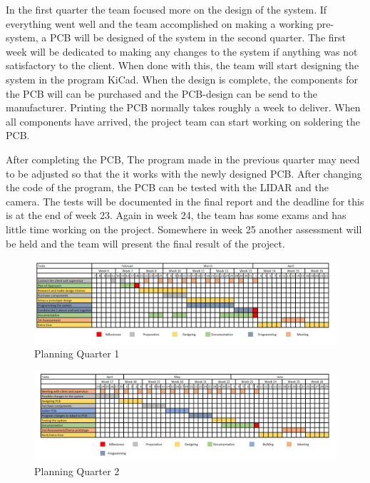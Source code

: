 In the first quarter the team focused more on the design of the system. If everything went well and the team accomplished on making a working pre-system, a PCB will be designed of the system in the second quarter. The first week will be dedicated to making any changes to the system if anything was not satisfactory to the client. When done with this, the team will start designing the system in the program KiCad. When the design is complete, the components for the PCB will can be purchased and the PCB-design can be send to the manufacturer. Printing the PCB normally takes roughly a week to deliver. When all components have arrived, the project team can start working on soldering the PCB. 

\justify
After completing the PCB, The program made in the previous quarter may need to be adjusted so that the it works with the newly designed PCB. After changing the code of the program, the PCB can be tested with the LIDAR and the camera. The tests will be documented in the final report and the deadline for this is at the end of week 23. Again in week 24, the team has some exams and has little time working on the project. Somewhere in week 25 another assessment will be held and the team will present the final result of the project.

\newpage

\begin{landscape}

\begin{figure}
    \centering
    \includegraphics[scale = 0.6]{images/Planning_Lider_Q1.png}
    \caption{Planning Quarter 1}
    \label{fig:PQ1}
\end{figure}

\begin{figure}
    \centering
    \includegraphics[scale = 0.6]{images/Planning_Lider_Q2.png}
    \caption{Planning Quarter 2}
    \label{fig:PQ2}
\end{figure}

\end{landscape}